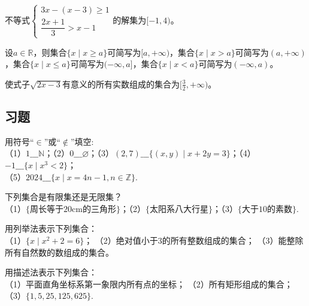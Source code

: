 \documentclass[lang=cn,math=cm,chinesefont=nofont,11pt,scheme=chinese]{elegantbook}
\begin{document}
\begin{example}
  不等式$\begin{cases}3x-(x-3)\geqslant1\\\dfrac{2x+1}{3}>x-1\end{cases}$的解集为$[-1,4)$。
\end{example}

\begin{definition}[无穷区间]
    设$a\in\mathbb{R}$，则集合$\{x\mid x\geq a\}$可简写为$[a,+\infty)$，集合$\{x\mid x>a\}$可简写为$(a,+\infty)$，集合$\{x\mid x\leq a\}$可简写为$(-\infty,a]$，集合$\{x\mid x<a\}$可简写为$(-\infty,a)$。
\end{definition}

\begin{example}
  使式子$\sqrt{2x-3}$有意义的所有实数组成的集合为$[\frac{3}{2},+\infty)$。
\end{example}

\subsection{习题}

\begin{exercise}\label{exer:1}
  用符号“$\in$”或“$\notin$”填空:\\
（1）$1\_\_\_\mathbb{N}$；（2）$0\_\_\_\varnothing$；（3）$(2,7)\_\_\_\{(x,y)\mid x+2y=3\}$；（4）$-1\_\_\_\{x\mid x^{3}<2\}$；\\（5）$2024\_\_\_\{x\mid x=4n-1,n\in\mathbb{Z}\}$.
\end{exercise}

\begin{exercise}\label{exer:2}
  下列集合是有限集还是无限集？\\
  （1）$\{\text{周长等于20cm的三角形}\}$；（2）$\{\text{太阳系八大行星}\}$；（3）$\{\text{大于10的素数}\}$.
\end{exercise}

\begin{exercise}\label{exer:3}
  用列举法表示下列集合：\\
  （1）$\{x\mid x^2+2=6\}$；
  （2）绝对值小于3的所有整数组成的集合；
  （3）能整除所有自然数的数组成的集合。
\end{exercise}

\begin{exercise}\label{exer:4}
  用描述法表示下列集合：\\
  （1）平面直角坐标系第一象限内所有点的坐标；
  （2）所有矩形组成的集合；
  （3）$\{1,5,25,125,625\}$.
\end{exercise}
\end{document}
